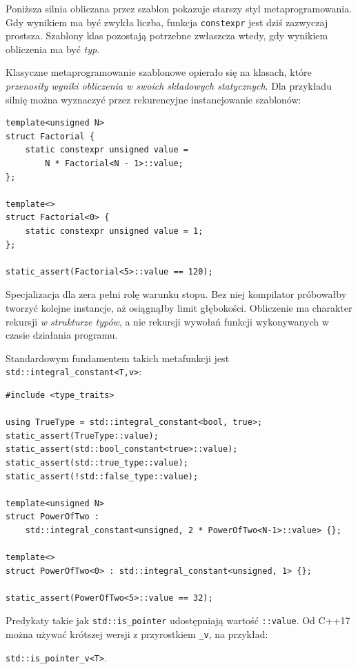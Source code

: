 Poniższa silnia obliczana przez szablon pokazuje starszy styl
metaprogramowania. Gdy wynikiem ma być zwykła liczba, funkcja
\texttt{constexpr} jest dziś zazwyczaj prostsza. Szablony klas
pozostają potrzebne zwłaszcza wtedy, gdy wynikiem obliczenia ma być
\emph{typ}.

Klasyczne metaprogramowanie szablonowe opierało się na klasach, które
\emph{przenosiły wyniki obliczenia w swoich składowych statycznych}.
Dla przykładu silnię można wyznaczyć przez rekurencyjne instancjowanie
szablonów:

\begin{lstlisting}
template<unsigned N>
struct Factorial {
    static constexpr unsigned value =
        N * Factorial<N - 1>::value;
};

template<>
struct Factorial<0> {
    static constexpr unsigned value = 1;
};

static_assert(Factorial<5>::value == 120);
\end{lstlisting}

Specjalizacja dla zera pełni rolę warunku stopu. Bez niej kompilator
próbowałby tworzyć kolejne instancje, aż osiągnąłby limit głębokości.
Obliczenie ma charakter rekursji \emph{w strukturze typów}, a nie
rekursji wywołań funkcji wykonywanych w czasie działania programu.

Standardowym fundamentem takich metafunkcji jest
\texttt{std::integral\_constant<T,v>}:

\begin{lstlisting}
#include <type_traits>

using TrueType = std::integral_constant<bool, true>;
static_assert(TrueType::value);
static_assert(std::bool_constant<true>::value);
static_assert(std::true_type::value);
static_assert(!std::false_type::value);

template<unsigned N>
struct PowerOfTwo :
    std::integral_constant<unsigned, 2 * PowerOfTwo<N-1>::value> {};

template<>
struct PowerOfTwo<0> : std::integral_constant<unsigned, 1> {};

static_assert(PowerOfTwo<5>::value == 32);
\end{lstlisting}

Predykaty takie jak \texttt{std::is\_pointer} udostępniają wartość
\texttt{::value}. Od C++17 można używać krótszej wersji
z przyrostkiem \texttt{\_v}, na przykład:
\begin{center}
\texttt{std::is\_pointer\_v<T>}.
\end{center}

